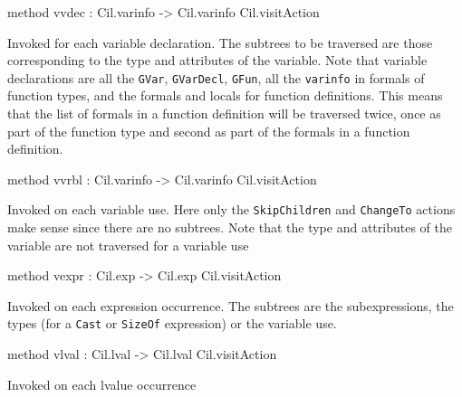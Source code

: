 \documentclass[11pt]{article}
\begin{document}
\begin{ocamldocobjectend}


\label{method:Cil.cilVisitor.vvdec}\begin{ocamldoccode}
method vvdec : Cil.varinfo -> Cil.varinfo Cil.visitAction
\end{ocamldoccode}
\begin{ocamldocdescription}
Invoked for each variable declaration. The subtrees to be traversed 
 are those corresponding to the type and attributes of the variable. 
 Note that variable declarations are all the {\tt{GVar}}, {\tt{GVarDecl}}, {\tt{GFun}}, 
 all the {\tt{varinfo}} in formals of function types, and the formals and 
 locals for function definitions. This means that the list of formals 
 in a function definition will be traversed twice, once as part of the 
 function type and second as part of the formals in a function 
 definition.


\end{ocamldocdescription}


\label{method:Cil.cilVisitor.vvrbl}\begin{ocamldoccode}
method vvrbl : Cil.varinfo -> Cil.varinfo Cil.visitAction
\end{ocamldoccode}
\begin{ocamldocdescription}
Invoked on each variable use. Here only the {\tt{SkipChildren}} and 
 {\tt{ChangeTo}} actions make sense since there are no subtrees. Note that 
 the type and attributes of the variable are not traversed for a 
 variable use


\end{ocamldocdescription}


\label{method:Cil.cilVisitor.vexpr}\begin{ocamldoccode}
method vexpr : Cil.exp -> Cil.exp Cil.visitAction
\end{ocamldoccode}
\begin{ocamldocdescription}
Invoked on each expression occurrence. The subtrees are the 
 subexpressions, the types (for a {\tt{Cast}} or {\tt{SizeOf}} expression) or the 
 variable use.


\end{ocamldocdescription}


\label{method:Cil.cilVisitor.vlval}\begin{ocamldoccode}
method vlval : Cil.lval -> Cil.lval Cil.visitAction
\end{ocamldoccode}
\begin{ocamldocdescription}
Invoked on each lvalue occurrence



\end{ocamldocdescription}
\end{ocamldocobjectend}
\end{document}
